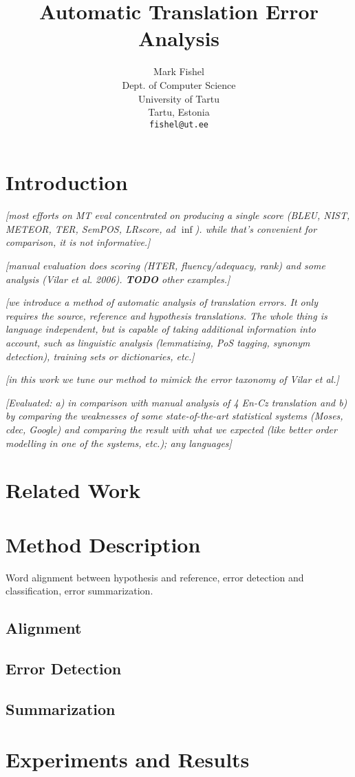 \documentclass[11pt]{article}
\title{Automatic Translation Error Analysis}
\author{Mark Fishel \\
  Dept. of Computer Science \\
  University of Tartu \\
  Tartu, Estonia \\
  {\tt fishel@ut.ee} \\
  }
\date{}
\newcommand{\tmp}[1]{\textit{[#1]}}
\begin{document}
\maketitle
\begin{abstract}
\end{abstract}

\section{Introduction}

\tmp{most efforts on MT eval concentrated on producing a single score (BLEU, NIST, METEOR, TER, SemPOS, LRscore, ad
$\inf$). while that's convenient for comparison, it is not informative.}

\tmp{manual evaluation does scoring (HTER, fluency/adequacy, rank) and some analysis (Vilar et al. 2006). {\bf TODO}
other examples.}

\tmp{we introduce a method of automatic analysis of translation errors. It only requires the source, reference and
hypothesis translations. The whole thing is language independent, but is capable of taking additional information into
account, such as linguistic analysis (lemmatizing, PoS tagging, synonym detection), training sets or dictionaries,
etc.}

\tmp{in this work we tune our method to mimick the error taxonomy of Vilar et al.}

\tmp{Evaluated: a) in comparison with manual analysis of 4 En-Cz translation and b) by comparing the weaknesses of some
state-of-the-art statistical systems (Moses, cdec, Google) and comparing the result with what we expected (like better
order modelling in one of the systems, etc.); any languages}

\section{Related Work}

\section{Method Description}

Word alignment between hypothesis and reference, error detection and classification, error summarization.

\subsection{Alignment}

\subsection{Error Detection}

\subsection{Summarization}

\section{Experiments and Results}
\end{document}
